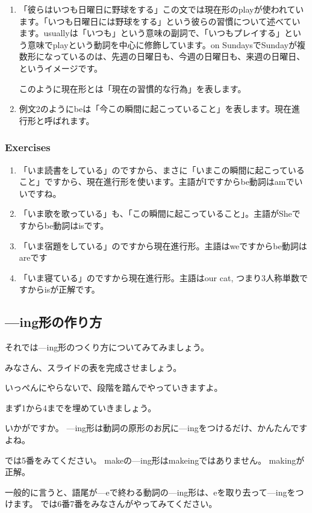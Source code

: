 \documentclass[book,jafontscale=0.9247]{jlreq}
\begin{document}
\begin{enumerate}
 \item 「彼らはいつも日曜日に野球をする」この文では現在形のplayが使われています。「いつも日曜日には野球をする」という彼らの習慣について述べています。usuallyは「いつも」という意味の副詞で、「いつもプレイする」という意味でplayという動詞を中心に修飾しています。on SundaysでSundayが複数形になっているのは、先週の日曜日も、今週の日曜日も、来週の日曜日、というイメージです。

このように現在形とは「現在の習慣的な行為」を表します。
 \item 例文2のようにbeは「今この瞬間に起こっていること」を表します。現在進行形と呼ばれます。
\end{enumerate}

\subsubsection{Exercises}
\begin{enumerate}
 \item 「いま読書をしている」のですから、まさに「いまこの瞬間に起こっていること」ですから、現在進行形を使います。主語がIですからbe動詞はamでいいですね。
 \item 「いま歌を歌っている」も、「この瞬間に起こっていること」。主語がSheですからbe動詞はisです。
 \item 「いま宿題をしている」のですから現在進行形。主語はweですからbe動詞はareです
 \item 「いま寝ている」のですから現在進行形。主語はour cat, つまり3人称単数ですからisが正解です。
\end{enumerate}

\newpage
\subsection{---ing形の作り方}

それでは---ing形のつくり方についてみてみましょう。

みなさん、スライドの表を完成させましょう。

いっぺんにやらないで、段階を踏んでやっていきますよ。

まず1から4までを埋めていきましょう。

いかがですか。
---ing形は動詞の原形のお尻に---ingをつけるだけ、かんたんですよね。

では5番をみてください。
makeの---ing形はmakeingではありません。
makingが正解。

一般的に言うと、語尾が---eで終わる動詞の---ing形は、eを取り去って---ingをつけます。
では6番7番をみなさんがやってみてください。
\end{document}
